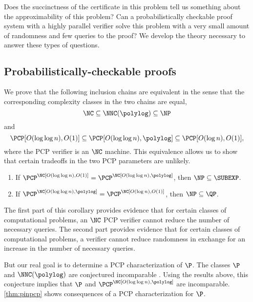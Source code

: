 \documentclass{article}
\begin{document}
Does the succinctness of the certificate in this problem tell us something about the approximability of this problem?
Can a probabilistically checkable proof system with a highly parallel verifier solve this problem with a very small amount of randomness and few queries to the proof?
We develop the theory necessary to answer these types of questions.

\subsection{Probabilistically-checkable proofs}
\label{sec:ncpcp}

We prove that the following inclusion chains are equivalent in the sense that the corresponding complexity classes in the two chains are equal,
\begin{equation*}
  \NC \subseteq \NNC(\polylog) \subseteq \NP
\end{equation*}
and
\begin{equation*}
  \PCP[O(\log \log n), O(1)] \subseteq \PCP[O(\log \log n), \polylog] \subseteq \PCP[O(\log n), O(1)],
\end{equation*}
where the PCP verifier is an $\NC$ machine.
This equivalence allows us to show that certain tradeoffs in the two PCP parameters are unlikely.
\begin{theorem}
  \mbox{}
  \begin{enumerate}
  \item If $\PCP^\NC[O(\log \log n), O(1)] = \PCP^\NC[O(\log \log n), \polylog]$, then $\NP \subseteq \SUBEXP$.
  \item If $\PCP^\NC[O(\log \log n), \polylog] = \PCP^\NC[O(\log n), O(1)]$, then $\NP \subseteq \QP$.
  \end{enumerate}
\end{theorem}

The first part of this corollary provides evidence that for certain classes of computational problems, an $\NC$ PCP verifier cannot reduce the number of necessary queries.
The second part provides evidence that for certain classes of computational problems, a verifier cannot reduce randomness in exchange for an increase in the number of necessary queries.

But our real goal is to determine a PCP characterization of $\P$.
The classes $\P$ and $\NNC(\polylog)$ are conjectured incomparable \autocite{wolf94}.
Using the results above, this conjecture implies that $\P$ and $\PCP^\NC[O(\log \log n), \polylog]$ are incomparable.
\autoref{thm:pinpcp} shows consequences of a PCP characterization for $\P$.
\end{document}
